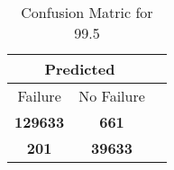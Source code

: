 \begin{table}[] 
\label{Table: Prediction Accuracy-DMD99.5OnlySunEKF-resetReflection-Reflection} 
\caption{Confusion Matric for 99.5} 
\centering 
\begin{tabular} 
 {@{}ccc@{}} 
\toprule 
\multicolumn{2}{c}{\textbf{Predicted}}
 \\ \midrule 
\multicolumn{1}{|c|}{Failure} & 
\multicolumn{1}{c|}{No Failure}
 \\ \midrule 
\multicolumn{1}{|c|}{\color{green}\textbf{129633}} & 
\multicolumn{1}{c|}{\color{red}\textbf{661}}
 \\ \midrule 
\multicolumn{1}{|c|}{\color{red}\textbf{201}} & 
\multicolumn{1}{c|}{\color{green}\textbf{39633}}
 \\ \bottomrule 
\end{tabular} 
\end{table} 
